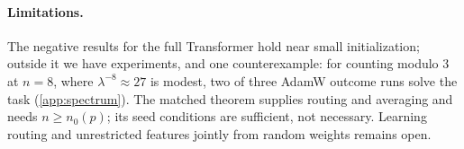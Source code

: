 \paragraph{Limitations.} The negative results for the full Transformer hold near small initialization;
outside it we have experiments, and one counterexample: for counting modulo $3$ at $n=8$, where
$\lambda^{-8}\approx27$ is modest, two of three AdamW outcome runs solve the task (\cref{app:spectrum}).
The matched theorem supplies routing and averaging and needs $n\ge n_0(p)$; its seed conditions are sufficient,
not necessary. Learning routing and unrestricted features jointly from random weights remains open.
